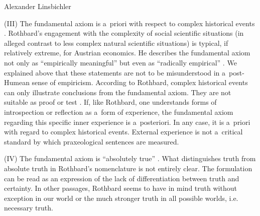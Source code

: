 \begin{artengenv}{Alexander Linsbichler}
\medskip

\noindent (III) The fundamental axiom is a~priori with respect to complex historical events 
\parencites[][p.318]{rothbard_defense_1957}[][p.25]{rothbard_praxeology:_1976}. %
 Rothbard's engagement with the complexity of social scientific situations (in alleged contrast to less complex natural scientific situations) is typical, if relatively extreme, for Austrian economics. He describes the fundamental axiom not only as ``empirically meaningful'' but even as ``radically empirical'' 
\parencite[][p.24]{rothbard_praxeology:_1976}. %
 We explained above that these statements are not to be misunderstood in a~post-Humean sense of empiricism. According to Rothbard, complex historical events can only illustrate conclusions from the fundamental axiom. They are not suitable as proof or test 
\parencites[][p.181]{rothbard_mises_1951}[][pp.944–945]{rothbard_praxeology_1951}. %
 If, like Rothbard, one understands forms of introspection or reflection as a~form of experience, the fundamental axiom regarding this specific inner experience is a~posteriori. In any case, it is a~priori with regard to complex historical events. External experience is not a~critical standard by which praxeological sentences are measured.

\medskip

\noindent (IV) The fundamental axiom is ``absolutely true'' 
\parencite[][pp.314]{rothbard_defense_1957}. %
 What distinguishes truth from absolute truth in Rothbard's nomenclature is not entirely clear. The formulation can be read as an expression of the lack of differentiation between truth and certainty. In other passages, Rothbard seems to have in mind truth without exception in our world or the much stronger truth in all possible worlds, i.e. necessary truth.


\end{artengenv}
